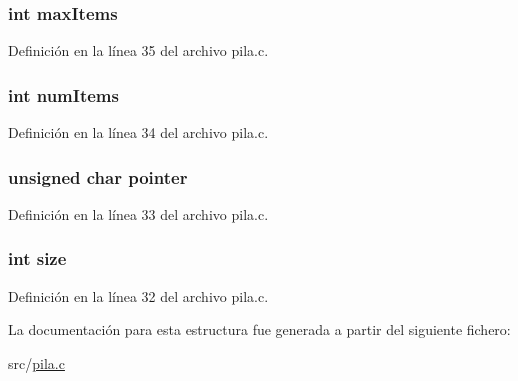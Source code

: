 \subsubsection[{max\+Items}]{\setlength{\rightskip}{0pt plus 5cm}int max\+Items}\label{struct_s_t___p_i_l_a_ab042caa09e8430028d87252ad6646a52}


Definición en la línea 35 del archivo pila.\+c.

\hypertarget{struct_s_t___p_i_l_a_a1411ea3b26a34297217f0225315d9758}{}
\subsubsection[{num\+Items}]{\setlength{\rightskip}{0pt plus 5cm}int num\+Items}\label{struct_s_t___p_i_l_a_a1411ea3b26a34297217f0225315d9758}


Definición en la línea 34 del archivo pila.\+c.

\hypertarget{struct_s_t___p_i_l_a_ab0785544ba66016a8ee8f818ea08b1c2}{}
\subsubsection[{pointer}]{\setlength{\rightskip}{0pt plus 5cm}unsigned char pointer}\label{struct_s_t___p_i_l_a_ab0785544ba66016a8ee8f818ea08b1c2}


Definición en la línea 33 del archivo pila.\+c.

\hypertarget{struct_s_t___p_i_l_a_a439227feff9d7f55384e8780cfc2eb82}{}
\subsubsection[{size}]{\setlength{\rightskip}{0pt plus 5cm}int size}\label{struct_s_t___p_i_l_a_a439227feff9d7f55384e8780cfc2eb82}


Definición en la línea 32 del archivo pila.\+c.



La documentación para esta estructura fue generada a partir del siguiente fichero\+:\begin{DoxyCompactItemize}
\item 
src/\hyperlink{pila_8c}{pila.\+c}\end{DoxyCompactItemize}
